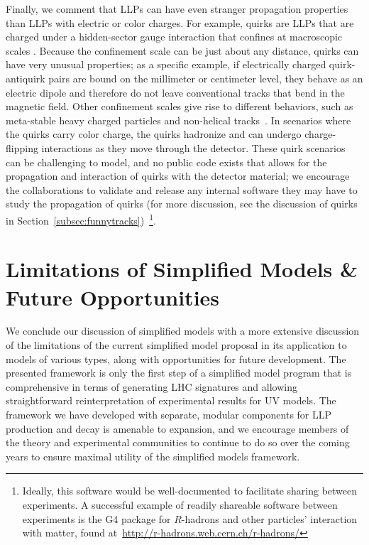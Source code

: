 Finally, we comment that LLPs can have even stranger propagation properties than  LLPs with electric or color charges.
For example, quirks are LLPs that are charged under a hidden-sector gauge interaction that confines at macroscopic scales \cite{Kang:2008ea}.
Because the confinement scale can be just about any distance, quirks can have very unusual properties; as a specific example, if electrically charged quirk-antiquirk pairs are bound on the millimeter or centimeter level, they behave as an electric dipole and therefore do not leave conventional tracks that bend in the magnetic field.
Other confinement scales give rise to different behaviors, such as meta-stable heavy charged particles and non-helical tracks~\cite{Farina:2017cts,Knapen:2017kly}.
In scenarios where the quirks carry color charge, the quirks hadronize and can undergo charge-flipping interactions as they move through the detector.
These quirk scenarios can be challenging to model, and no public code exists that allows for the propagation and interaction of quirks with the detector material; we encourage the collaborations to validate and release any internal software they may have to study the propagation of quirks (for more discussion, see the discussion of quirks  in Section~\ref{subsec:funnytracks})~\footnote{Ideally, this software would be well-documented to facilitate sharing between experiments.
A successful example of readily shareable software between experiments is the G4 package for $R$-hadrons and other particles' interaction with matter, found at~\url{http://r-hadrons.web.cern.ch/r-hadrons/}}.




\section{Limitations of Simplified Models \& Future Opportunities}\label{sec:simplified_future}

We conclude our discussion of simplified models with a more extensive discussion of the limitations of the current simplified model proposal in its application to models of various types, along with opportunities for future development.
The presented framework is only the first step of a simplified model program that is comprehensive in terms of generating LHC signatures and  allowing straightforward reinterpretation of experimental results for UV models.
The framework we have developed with separate, modular components for LLP production and decay is amenable to expansion, and we encourage members of the theory and experimental communities to continue to do so over the coming years to ensure maximal utility of the simplified models framework.


